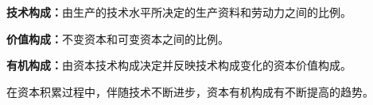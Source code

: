\textbf{{技术构成}：}由生产的技术水平所决定的生产资料和劳动力之间的比例。

\textbf{{价值构成}：}不变资本和可变资本之间的比例。

\textbf{{有机构成}：}由资本技术构成决定并反映技术构成变化的资本价值构成。

{在资本积累过程中，伴随技术不断进步，资本有机构成有不断提高的趋势。}
